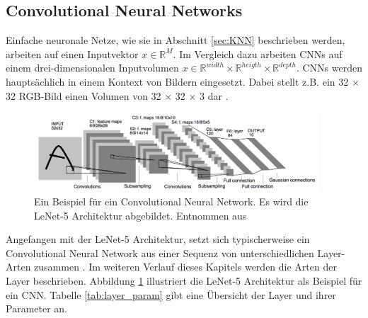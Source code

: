 \subsection{Convolutional Neural Networks}
\label{sec:CNN}
Einfache neuronale Netze, wie sie in Abschnitt \ref{sec:KNN} beschrieben werden, arbeiten auf einen Inputvektor $x \in \mathbb{R}^{M}$. Im Vergleich dazu arbeiten CNNs auf einem drei-dimensionalen Inputvolumen $x \in \mathbb{R}^{width} \times \mathbb{R}^{heigth} \times \mathbb{R}^{depth}$. CNNs werden hauptsächlich in einem Kontext von Bildern eingesetzt. Dabei stellt z.B. ein 32 $\times$ 32 RGB-Bild einen Volumen von 32 $\times$ 32 $\times$ 3 dar \cite{johnsonCS231nConvolutionalNeurala}.

\begin{figure}
	\centering
	\includegraphics[width=0.95\textwidth]{images/ann_conv/lenet5.png}
	\caption{Ein Beispiel für ein Convolutional Neural Network. Es wird die LeNet-5 Architektur abgebildet. Entnommen aus \cite{lecunGradientBasedLearningApplied1998}}
	\label{fig:lenet5}
\end{figure}


Angefangen mit der LeNet-5 \cite{lecunGradientBasedLearningApplied1998} Architektur, setzt sich typischerweise ein Convolutional Neural Network aus einer Sequenz von unterschiedlichen Layer-Arten zusammen \cite{szegedyGoingDeeperConvolutions2015, johnsonCS231nConvolutionalNeurala}. Im weiteren Verlauf dieses Kapitels werden die Arten der Layer beschrieben. Abbildung \ref{fig:lenet5} illustriert die LeNet-5 Architektur als Beispiel für ein CNN. Tabelle \ref{tab:layer_param} gibt eine Übersicht der Layer und ihrer Parameter an.

